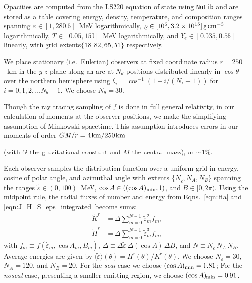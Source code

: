 \documentclass[aps,floatfix,prd,superscriptaddress,twocolumn]{revtex4-1}
\newcommand{\todo}[1]{\marginpar{\tiny{\textcolor{red}{#1}}}}
\renewcommand\todo[1]{} %
\begin{document}
Opacities are computed from the LS220 equation of state using
\lstinline{NuLib} and are stored as a table covering
energy, density, temperature, and composition ranges
spanning $\varepsilon\in[1,280.5]$~MeV logarithmically,
$\varrho\in[10^6,3.2\times10^{15}]\,{\rm g}\,{\rm cm}^{-3}$ logarithmically,
$T\in[0.05,150]$~MeV logarithmically, and 
$Y_e\in[0.035,0.55]$ linearly,
with grid extents$\{18,82,65,51\}$ respectively.

We place stationary (i.e.\ Eulerian) observers at fixed coordinate radius
$r=250$~km in the $y$-$z$ plane along an arc at $N_\theta$ positions
distributed linearly in $\cos\theta$ over the northern hemisphere
using $\theta_i=\cos^{-1}\left(1-i/(N_\theta-1)\right)$
for $i=0,1,2,\ldots N_\theta-1$.
We choose $N_\theta=30$.

Though the ray tracing sampling of $f$ is done in full general relativity,
in our calculation of moments at the observer positions,
we make the simplifying assumption of Minkowski spacetime.
This assumption introduces errors in our moments of order
$GM/r=4\,{\rm km}/250\,{\rm km}$
\todo{too simplistic}
(with $G$ the gravitational constant and $M$ the central mass),
or $\sim 1\%$.

Each observer samples the distribution function over a uniform grid
in energy, cosine of polar angle, and azimuthal angle with extents
$\{N_{\tilde{\varepsilon}},N_A, N_B\}$ spanning the ranges
$\tilde{\varepsilon}\in(0,100)$~MeV,
$\cos A\in\left((\cos A)_{\rm min}, 1\right)$, and
$B\in[0,2\pi)$.
Using the midpoint rule,
the radial fluxes of number and energy from Eqns.~\ref{eqn:Ha}
and \ref{eqn:J_H_S_eps_integrated} become sums:
\begin{align}
  \label{eqn:Kr_minkowski}
  \tilde{K}^r &= \Delta
  \sum\limits_{m=0}^{N-1}
  \tilde{\varepsilon}_m^2 f_m,\\
  \label{eqn:Hr_minkowski}
  \tilde{H}^r &= \Delta
  \sum\limits_{m=0}^{N-1}
  \tilde{\varepsilon}_m^3 f_m,
\end{align}
with $f_m \equiv f(\tilde{\varepsilon}_m,\cos A_m, B_m)$,
$\Delta \equiv \Delta\tilde{\varepsilon}\, \Delta(\cos A)\, \Delta B$, and
$N \equiv N_{\tilde{\varepsilon}}\, N_A\, N_B$.
Average energies are given by
$\langle\tilde{\varepsilon}\rangle(\theta)=H^r(\theta)/K^r(\theta)$.
We choose $N_{\tilde{\varepsilon}}=30$, $N_A=120$, and $N_B=20$.
For the \emph{scat} case we choose $(\cos A)_{\rm min}=0.81$;
For the \emph{noscat} case, presenting a smaller emitting region,
we choose $(\cos A)_{\rm min}=0.91$.
\end{document}
